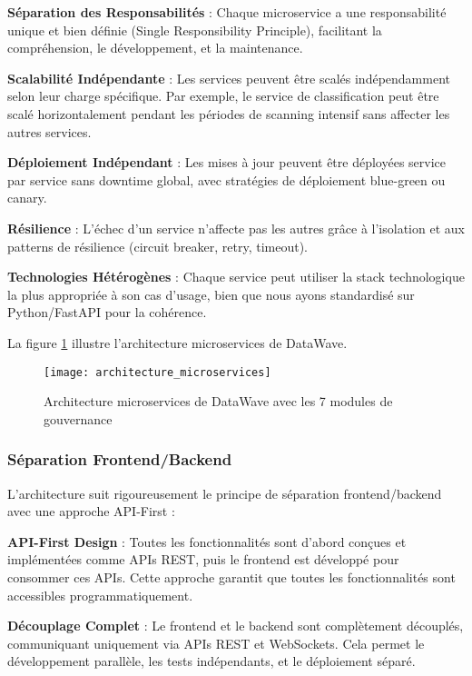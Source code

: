 \textbf{Séparation des Responsabilités} : Chaque microservice a une responsabilité unique et bien définie (Single Responsibility Principle), facilitant la compréhension, le développement, et la maintenance.

\textbf{Scalabilité Indépendante} : Les services peuvent être scalés indépendamment selon leur charge spécifique. Par exemple, le service de classification peut être scalé horizontalement pendant les périodes de scanning intensif sans affecter les autres services.

\textbf{Déploiement Indépendant} : Les mises à jour peuvent être déployées service par service sans downtime global, avec stratégies de déploiement blue-green ou canary.

\textbf{Résilience} : L'échec d'un service n'affecte pas les autres grâce à l'isolation et aux patterns de résilience (circuit breaker, retry, timeout).

\textbf{Technologies Hétérogènes} : Chaque service peut utiliser la stack technologique la plus appropriée à son cas d'usage, bien que nous ayons standardisé sur Python/FastAPI pour la cohérence.

La figure \ref{fig:architecture_microservices} illustre l'architecture microservices de DataWave.

\begin{figure}[htpb]
\centering
\texttt{[image: architecture\_microservices]}
\caption{Architecture microservices de DataWave avec les 7 modules de gouvernance}
\label{fig:architecture_microservices}
\end{figure}

\subsubsection{Séparation Frontend/Backend}

L'architecture suit rigoureusement le principe de séparation frontend/backend avec une approche API-First :

\textbf{API-First Design} : Toutes les fonctionnalités sont d'abord conçues et implémentées comme APIs REST, puis le frontend est développé pour consommer ces APIs. Cette approche garantit que toutes les fonctionnalités sont accessibles programmatiquement.

\textbf{Découplage Complet} : Le frontend et le backend sont complètement découplés, communiquant uniquement via APIs REST et WebSockets. Cela permet le développement parallèle, les tests indépendants, et le déploiement séparé.


